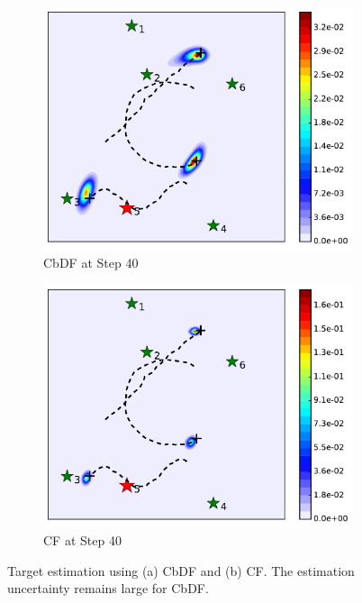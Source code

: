	\begin{figure}%
		\centering	
		\begin{subfigure}[b]{0.23\textwidth}
			\includegraphics[width=\textwidth]{figures/cons_hetero_mov_sen_mov_tar_rbt5_step40}
			\caption{CbDF at Step 40}\label{fig:cbdf_step40}
		\end{subfigure}	
		\begin{subfigure}[b]{0.23\textwidth}
			\includegraphics[width=\textwidth]{figures/cent_hetero_mov_sen_mov_tar_rbt1_step40}
			\caption{CF at Step 40}\label{fig:cf_step40}
		\end{subfigure}
		\caption{Target estimation using (a) CbDF and (b) CF. The estimation uncertainty remains large for CbDF.}
	\end{figure}
	

